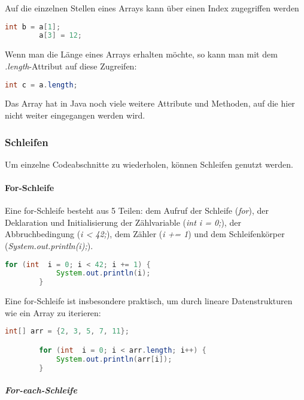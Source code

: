 \documentclass{article}
\begin{document}
	Auf die einzelnen Stellen eines Arrays kann über einen Index zugegriffen werden

	\begin{lstlisting}[language=Java, caption=Zugriff auf ein Array] 
		int b = a[1];
		a[3] = 12;
	\end{lstlisting}

	Wenn man die Länge eines Arrays erhalten möchte, so kann man mit dem \textit{.length}-Attribut auf diese Zugreifen:

	\begin{lstlisting}[language=Java, caption=Zugriff auf die Array-Länge] 
		int c = a.length;
	\end{lstlisting}

	Das Array hat in Java noch viele weitere Attribute und Methoden, auf die hier nicht weiter eingegangen werden wird.

	\subsubsection{Schleifen}
	Um einzelne Codeabschnitte zu wiederholen, können Schleifen genutzt werden.

	\paragraph{For-Schleife}
	Eine for-Schleife besteht aus 5 Teilen: dem Aufruf der Schleife (\textit{for}), der Deklaration und Initialisierung der Zählvariable (\textit{int i = 0;}), der Abbruchbedingung (\textit{i < 42;}), dem Zähler (\textit{i += 1}) und dem Schleifenkörper (\textit{System.out.println(i);}).


	\begin{lstlisting}[language=Java, caption=beispiel für eine for-Schleife] 
		for (int  i = 0; i < 42; i += 1) {
			System.out.println(i);
		}
	\end{lstlisting}

	Eine for-Schleife ist insbesondere praktisch, um durch lineare Datenstrukturen wie ein Array zu iterieren:

	\begin{lstlisting}[language=Java, caption=Iteration durch ein Array mit einer for-Schleife] 
		int[] arr = {2, 3, 5, 7, 11};

		for (int  i = 0; i < arr.length; i++) {
			System.out.println(arr[i]);
		}
	\end{lstlisting}

	\subparagraph{For-each-Schleife}
\end{document}
